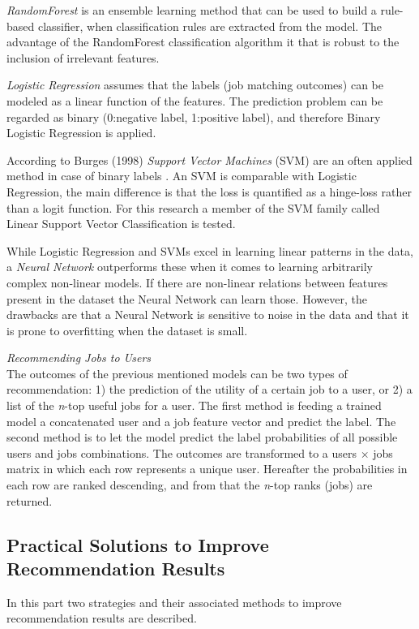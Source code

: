 \textit{RandomForest} \cite{breiman2001random} is an ensemble learning method that can be used to build a rule-based classifier, when classification rules are extracted from the model.
The advantage of the RandomForest classification algorithm it that is robust to the inclusion of irrelevant features.

\textit{Logistic Regression} \cite{hosmer2013applied} assumes that the labels (job matching outcomes) can be modeled as a linear function of the features.
The prediction problem can be regarded as binary (0:negative label, 1:positive label), and therefore Binary Logistic Regression is applied.

According to Burges (1998) \textit{Support Vector Machines} (SVM) are an often applied method in case of binary labels \cite{burges1998tutorial}.
An SVM is comparable with Logistic Regression, the main difference is that the loss is quantified as a hinge-loss rather than a logit function. 
For this research a member of the SVM family called Linear Support Vector Classification is tested.

While Logistic Regression and SVMs excel in learning linear patterns in the data, a \textit{Neural Network} \cite{bishop1995neural} outperforms these when it comes to learning arbitrarily complex non-linear models.
If there are non-linear relations between features present in the dataset the Neural Network can learn those.
However, the drawbacks are that a Neural Network is sensitive to noise in the data and that it is prone to overfitting when the dataset is small. 

\textit{Recommending Jobs to Users} \\
The outcomes of the previous mentioned models can be two types of recommendation: 1) the prediction of the utility of a certain job to a user, or 2) a list of the \textit{n}-top useful jobs for a user.
The first method is feeding a trained model a concatenated user and a job feature vector and predict the label.
The second method is to let the model predict the label probabilities of all possible users and jobs combinations. 
The outcomes are transformed to a users $\times$ jobs matrix in which each row represents a unique user.
Hereafter the probabilities in each row are ranked descending, and from that the \textit{n}-top ranks (jobs) are returned. 

\subsection{Practical Solutions to Improve Recommendation Results}
\label{ssec:psirr}
In this part two strategies and their associated methods to improve recommendation results are described.

